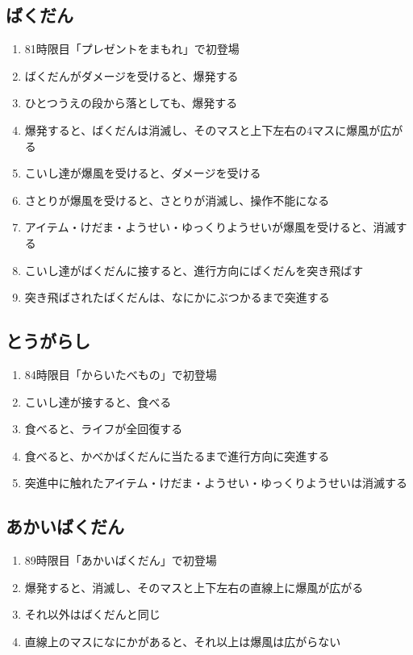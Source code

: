 \subsection{ばくだん}
\begin{enumerate}[label={\sarrow}]
\item 81時限目「プレゼントをまもれ」で初登場
\item ばくだんがダメージを受けると、爆発する
\item ひとつうえの段から落としても、爆発する
\item 爆発すると、ばくだんは消滅し、そのマスと上下左右の4マスに爆風が広がる
\item こいし達が爆風を受けると、ダメージを受ける
\item さとりが爆風を受けると、さとりが消滅し、操作不能になる
\item アイテム・けだま・ようせい・ゆっくりようせいが爆風を受けると、消滅する
\item こいし達がばくだんに接すると、進行方向にばくだんを突き飛ばす
\item 突き飛ばされたばくだんは、なにかにぶつかるまで突進する
\end{enumerate}


\subsection{とうがらし}
\begin{enumerate}[label={\sarrow}]
\item 84時限目「からいたべもの」で初登場
\item こいし達が接すると、食べる
\item 食べると、ライフが全回復する
\item 食べると、かべかばくだんに当たるまで進行方向に突進する
\item 突進中に触れたアイテム・けだま・ようせい・ゆっくりようせいは消滅する
\end{enumerate}


\subsection{あかいばくだん}
\begin{enumerate}[label={\sarrow}]
\item 89時限目「あかいばくだん」で初登場
\item 爆発すると、消滅し、そのマスと上下左右の直線上に爆風が広がる
\item それ以外はばくだんと同じ
\item 直線上のマスになにかがあると、それ以上は爆風は広がらない
\end{enumerate}


